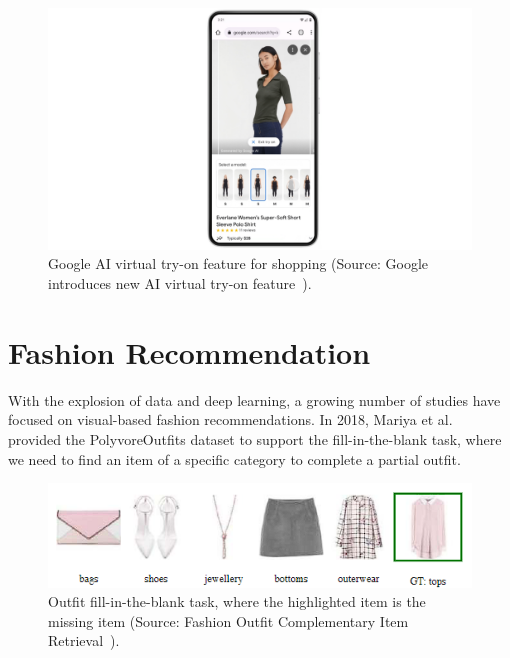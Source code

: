 \begin{figure}[h!]
    \centering
    \includegraphics[width=\linewidth]{content/resources/images/literature-review/google-tryon.png}
    \caption{Google AI virtual try-on feature for shopping (Source: Google introduces new AI virtual try-on feature~\cite{GoogleVTO-GoogleBlog2023-Clothes}).}
    \label{fig:commercial-google}
\end{figure}


 \newpage
\section{Fashion Recommendation}
With the explosion of data and deep learning, a growing number of studies have focused on visual-based fashion recommendations. 
In 2018, Mariya et al.~\cite{Mariya-ECCV18-Learning} provided the PolyvoreOutfits dataset to support the fill-in-the-blank task, where we need to find an item of a specific category to complete a partial outfit. 
\begin{figure}[h!]
    \centering
    \includegraphics[width=0.6\linewidth]{content/resources/images/literature-review/fitb.PNG}
    \caption{Outfit fill-in-the-blank task, where the highlighted item is the missing item (Source: Fashion Outfit Complementary Item Retrieval~\cite{Lin-CVPR2020-Fashion}).}
    \label{fig:fitb-task}
\end{figure}

